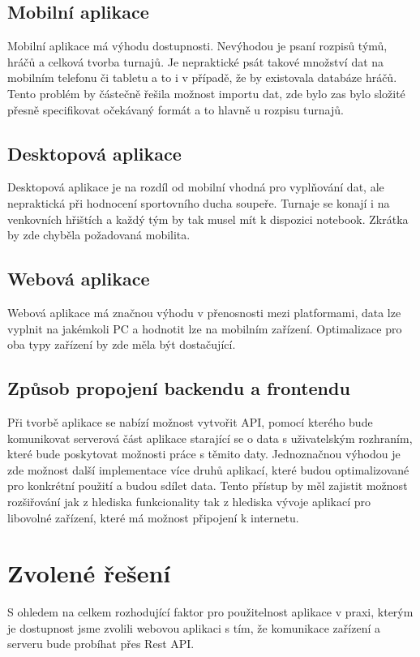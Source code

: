 \documentclass[thesis=B,czech]{FITthesis}[2012/06/26]
\begin{document}
		\subsection{Mobilní aplikace}
			Mobilní aplikace má výhodu dostupnosti. Nevýhodou je psaní rozpisů týmů, hráčů a celková tvorba turnajů. Je nepraktické psát takové množství dat na mobilním telefonu či tabletu a to i v případě, že by existovala databáze hráčů. Tento problém by částečně řešila možnost importu dat, zde bylo zas bylo složité přesně specifikovat očekávaný formát a to hlavně u rozpisu turnajů.
		
		\subsection{Desktopová aplikace}
			Desktopová aplikace je na rozdíl od mobilní vhodná pro vyplňování dat, ale nepraktická při hodnocení sportovního ducha soupeře. Turnaje se konají i na venkovních hřištích a každý tým by tak musel mít k dispozici notebook. Zkrátka by zde chyběla požadovaná mobilita.
		
		\subsection{Webová aplikace}
			Webová aplikace má značnou výhodu v přenosnosti mezi platformami, data lze vyplnit na jakémkoli PC a hodnotit lze na mobilním zařízení. Optimalizace pro oba typy zařízení by zde měla být dostačující.
		
		\subsection{Způsob propojení backendu a frontendu}
			Při tvorbě aplikace se nabízí možnost vytvořit API, pomocí kterého bude komunikovat serverová část aplikace starající se o data s uživatelským rozhraním, které bude poskytovat možnosti práce s těmito daty. Jednoznačnou výhodou je zde možnost další implementace více druhů aplikací, které budou optimalizované pro konkrétní použití a budou sdílet data. Tento přístup by měl zajistit možnost rozšiřování jak z hlediska funkcionality tak z hlediska vývoje aplikací pro libovolné zařízení, které má možnost připojení k internetu.
		
	\section{Zvolené řešení}
		S ohledem na celkem rozhodující faktor pro použitelnost aplikace v praxi, kterým je dostupnost jsme zvolili webovou aplikaci s tím, že komunikace zařízení a serveru bude probíhat přes Rest API. %
		
\end{document}
